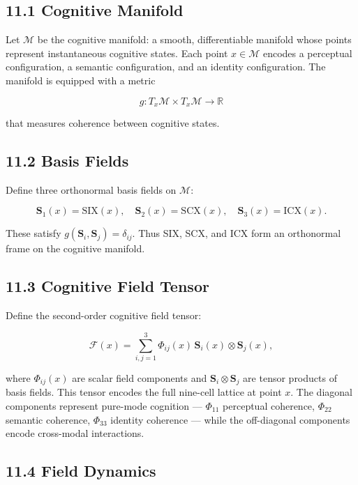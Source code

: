 \subsection{11.1 Cognitive Manifold}\label{cognitive-manifold}

Let \(\mathcal{M}\) be the cognitive manifold: a smooth, differentiable manifold whose points represent instantaneous cognitive states. Each point \(x \in \mathcal{M}\) encodes a perceptual configuration, a semantic configuration, and an identity configuration. The manifold is equipped with a metric

\[
g : T_x\mathcal{M} \times T_x\mathcal{M} \rightarrow \mathbb{R}
\]

that measures coherence between cognitive states.

\subsection{11.2 Basis Fields}\label{basis-fields}

Define three orthonormal basis fields on \(\mathcal{M}\):

\[
\mathbf{S}_1(x) = \mathrm{SIX}(x),\quad
\mathbf{S}_2(x) = \mathrm{SCX}(x),\quad
\mathbf{S}_3(x) = \mathrm{ICX}(x).
\]

These satisfy \(g(\mathbf{S}_i,\mathbf{S}_j)=\delta_{ij}\). Thus SIX, SCX, and ICX form an orthonormal frame on the cognitive manifold.

\subsection{11.3 Cognitive Field Tensor}\label{cognitive-field-tensor-11}

Define the second-order cognitive field tensor:

\[
\mathcal{F}(x) = \sum_{i,j=1}^{3} \Phi_{ij}(x)\, \mathbf{S}_i(x) \otimes \mathbf{S}_j(x),
\]

where \(\Phi_{ij}(x)\) are scalar field components and \(\mathbf{S}_i \otimes \mathbf{S}_j\) are tensor products of basis fields. This tensor encodes the full nine-cell lattice at point \(x\). The diagonal components represent pure-mode cognition --- \(\Phi_{11}\) perceptual coherence, \(\Phi_{22}\) semantic coherence, \(\Phi_{33}\) identity coherence --- while the off-diagonal components encode cross-modal interactions.

\subsection{11.4 Field Dynamics}\label{field-dynamics-11}

